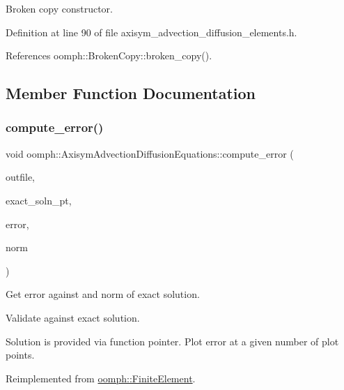Broken copy constructor. 



Definition at line 90 of file axisym\+\_\+advection\+\_\+diffusion\+\_\+elements.\+h.



References oomph\+::\+Broken\+Copy\+::broken\+\_\+copy().



\subsection{Member Function Documentation}
\mbox{\label{classoomph_1_1AxisymAdvectionDiffusionEquations_a9370e0782ee86c2bc2fe3a083979910b}} 
\subsubsection{\texorpdfstring{compute\+\_\+error()}{compute\_error()}}
{\footnotesize\ttfamily void oomph\+::\+Axisym\+Advection\+Diffusion\+Equations\+::compute\+\_\+error (\begin{DoxyParamCaption}\item[{std\+::ostream \&}]{outfile,  }\item[{\hyperlink{classoomph_1_1FiniteElement_a690fd33af26cc3e84f39bba6d5a85202}{Finite\+Element\+::\+Steady\+Exact\+Solution\+Fct\+Pt}}]{exact\+\_\+soln\+\_\+pt,  }\item[{double \&}]{error,  }\item[{double \&}]{norm }\end{DoxyParamCaption})\hspace{0.3cm}{\ttfamily [virtual]}}



Get error against and norm of exact solution. 

Validate against exact solution.

Solution is provided via function pointer. Plot error at a given number of plot points. 

Reimplemented from \hyperlink{classoomph_1_1FiniteElement_a73c79a1f1e5b1d334757812a6bbd58ff}{oomph\+::\+Finite\+Element}.



